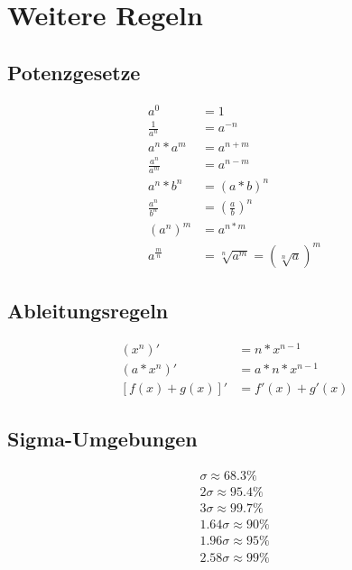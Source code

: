 \chapter{Weitere Regeln}

\section{Potenzgesetze}
\begin{align}
    a^0 &= 1 \\
    \frac{1}{a^n} &= a^{-n} \\
    a^n*a^m &= a^{n+m} \\
    \frac{a^n}{a^m} &= a^{n-m} \\
    a^n*b^n &= (a*b)^n \\
    \frac{a^n}{b^n} &= \left(\frac{a}{b}\right)^n \\
    \left(a^n\right)^m &= a^{n*m} \\
    a^{\frac{m}{n}} &= \sqrt[n]{a^m}=\left(\sqrt[n]{a}\right)^m
\end{align}

\section{Ableitungsregeln}
\begin{align}
    \left(x^n\right)' &=n*x^{n-1} \\
    \left(a*x^n\right)' &=a*n*x^{n-1} \\
    \left[f(x)+g(x)\right]' &=f'(x)+g'(x)
\end{align}

\section{Sigma-Umgebungen}
\begin{align}
    \sigma \approx 68.3\% \\
    2\sigma \approx 95.4\% \\
    3\sigma \approx 99.7\% \\
    1.64\sigma \approx 90\% \\
    1.96\sigma \approx 95\% \\
    2.58\sigma \approx 99\%
\end{align}
